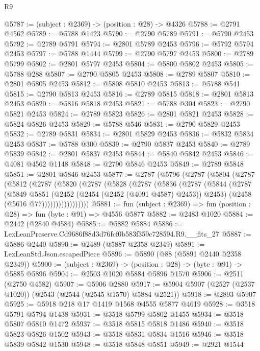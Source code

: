 \begin{lexlean}{R9}
\begin{coremodule}
@5787 := (subject : @2369) -> (position : @28) -> @4326
@5788 := @2791 @4562
@5789 := @5788 @1423
@5790 := @2790 @5789
@5791 := @5790 @2453
@5792 := @2789 @5791
@5794 := @2801 @5789 @2453
@5796 := @5792 @5794 @2453
@5797 := @5788 @1444
@5799 := @2790 @5797 @2453
@5800 := @2789 @5799
@5802 := @2801 @5797 @2453
@5804 := @5800 @5802 @2453
@5805 := @5788 @288
@5807 := @2790 @5805 @2453
@5808 := @2789 @5807
@5810 := @2801 @5805 @2453
@5812 := @5808 @5810 @2453
@5813 := @5788 @541
@5815 := @2790 @5813 @2453
@5816 := @2789 @5815
@5818 := @2801 @5813 @2453
@5820 := @5816 @5818 @2453
@5821 := @5788 @304
@5823 := @2790 @5821 @2453
@5824 := @2789 @5823
@5826 := @2801 @5821 @2453
@5828 := @5824 @5826 @2453
@5829 := @5788 @546
@5831 := @2790 @5829 @2453
@5832 := @2789 @5831
@5834 := @2801 @5829 @2453
@5836 := @5832 @5834 @2453
@5837 := @5788 @300
@5839 := @2790 @5837 @2453
@5840 := @2789 @5839
@5842 := @2801 @5837 @2453
@5844 := @5840 @5842 @2453
@5846 := @4081 @4562 @1148
@5848 := @2790 @5846 @2453
@5849 := @2789 @5848
@5851 := @2801 @5846 @2453
@5877 := @2787
    (@5796
      (@2787
        (@5804
          (@2787
            (@5812
              (@2787
                (@5820
                  (@2787
                    (@5828
                      (@2787
                        (@5836
                          (@2787
                            (@5844
                              (@2787
                                (@5849
                                  @5851
                                  (@2452 (@2454 (@2452 (@4091 @4587) @2453)) @2453)
                                  (@2458 (@5616 @77)))))))))))))))))
@5881 := fun (subject : @2369) => fun (position : @28) => fun (byte : @91) => @4556 @5877
@5882 := @2483 @1020
@5884 := @2442 (@2840 @4584)
@5885 := @5882 @5884
@5886 := LexLeanPreserve.Cd9686f88d3d76fcf0b583f359c728594.R9.__fits_27
@5887 := @5886 @2440
@5890 := @2489 (@5887 @2358 @2349)
@5891 := LexLeanStd.Json.escapedPiece
@5896 := @5890 (@88 (@5891 @2440 @2358 @2349))
@5900 := (subject : @2369) -> (position : @28) -> (byte : @91) -> @5885 @5896
@5904 := @2503 @1020 @5884 @5896 @1570
@5906 := @2511 (@2750 @4582)
@5907 := @5906 @2880
@5917 := @5904 @5907 (@2527 (@2537 @1020)) (@2543 (@2544 (@2545 @1570) @5884 @2521))
@5918 := @2893 @5907
@5925 := @5918 @218 @17 @1419 @1568 @4555 @5877 @4619
@5928 := @3518 @5791 @5794 @1438
@5931 := @3518 @5799 @5802 @1455
@5934 := @3518 @5807 @5810 @1472
@5937 := @3518 @5815 @5818 @1486
@5940 := @3518 @5823 @5826 @1502
@5943 := @3518 @5831 @5834 @1516
@5946 := @3518 @5839 @5842 @1530
@5948 := @3518 @5848 @5851
@5949 := @2921 @1544

\end{coremodule}
\end{lexlean}
